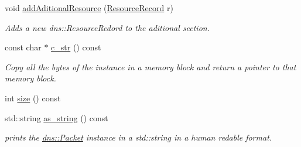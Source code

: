 \begin{DoxyCompactItemize}
void \hyperlink{structdns_1_1Packet_a384c1b1338b232cd10808b8e94817a98}{add\+Aditional\+Resource} (\hyperlink{structdns_1_1ResourceRecord}{Resource\+Record} r)
\begin{DoxyCompactList}\small\item\em Adds a new dns\+::\+Resource\+Redord to the aditional section. \end{DoxyCompactList}\item 
const char $\ast$ \hyperlink{structdns_1_1Packet_abe5254f0b79f2f3d41cee8a1b6654c6d}{c\+\_\+str} () const 
\begin{DoxyCompactList}\small\item\em Copy all the bytes of the instance in a memory block and return a pointer to that memory block. \end{DoxyCompactList}\item 
int \hyperlink{structdns_1_1Packet_a8edc861125aa062b29793fa0c5ff435a}{size} () const 
\item 
std\+::string \hyperlink{structdns_1_1Packet_ac8d0b87762ca208e97da4d0dddd39adb}{as\+\_\+string} () const 
\begin{DoxyCompactList}\small\item\em prints the \hyperlink{structdns_1_1Packet}{dns\+::\+Packet} instance in a std\+::string in a human redable format. \end{DoxyCompactList}\end{DoxyCompactItemize}
